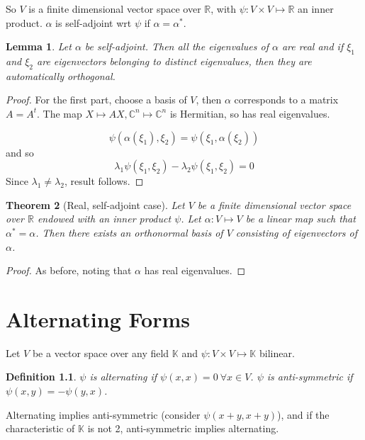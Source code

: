 \documentclass{notes}
\theoremstyle{plain}
\newtheorem{theorem}{Theorem}[chapter]
\newtheorem{definition}[theorem]{Definition}
\newtheorem{lemma}[theorem]{Lemma}
\begin{document}
So $V$ is a finite dimensional vector space over $\mathbb{R}$, with
$\psi : V \times V \mapsto \mathbb{R}$ an inner product.  $\alpha$ is
self-adjoint wrt $\psi$ if $\alpha = \alpha^*$.

\begin{lemma}
  Let $\alpha$ be self-adjoint.  Then all the eigenvalues of $\alpha$
  are real and if $\xi_1$ and $\xi_2$ are eigenvectors belonging to
  distinct eigenvalues, then they are automatically orthogonal.
\end{lemma}

\begin{proof}
  For the first part, choose a basis of $V$, then $\alpha$ corresponds
  to a matrix $A = A^t$.  The map $X \mapsto A X, \mathbb{C}^n \mapsto
  \mathbb{C}^n$ is Hermitian, so has real eigenvalues.

\[
\psi(\alpha(\xi_1),\xi_2)=\psi(\xi_1,\alpha(\xi_2))
\]
and so
\[
\lambda_1\psi(\xi_1,\xi_2)-\lambda_2\psi(\xi_1,\xi_2) = 0
\]
Since $\lambda_1 \ne \lambda_2$, result follows.
\end{proof}

\begin{theorem}[Real, self-adjoint case]
  Let $V$ be a finite dimensional vector space over $\mathbb{R}$
  endowed with an inner product $\psi$.  Let $\alpha : V \mapsto V$ be
  a linear map such that $\alpha^* = \alpha$.  Then there exists
  an orthonormal basis of $V$ consisting of eigenvectors of $\alpha$.
\end{theorem}

\begin{proof}
  As before, noting that $\alpha$ has real eigenvalues.
\end{proof}

\chapter{Alternating Forms}

Let $V$ be a vector space over any field $\mathbb{K}$ and $\psi : V
\times V \mapsto \mathbb{K}$ bilinear.

\begin{definition}
  $\psi$ is alternating if $\psi(x,x) = 0 \: \forall x \in V$.  $\psi$
  is anti-symmetric if $\psi(x,y) = - \psi(y,x)$.
\end{definition}

Alternating implies anti-symmetric (consider $\psi(x+y,x+y)$), and if
the characteristic of $\mathbb{K}$ is not 2, anti-symmetric implies
alternating.
\end{document}
